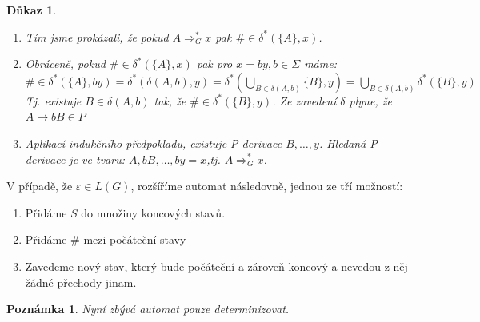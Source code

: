 \documentclass[10pt, a4paper, titlepage]{article}
\theoremstyle{note}
\newtheorem{dukaz}{Důkaz}
\newtheorem{poznamka}{Poznámka}
\begin{document}
\begin{dukaz}
\begin{enumerate}
\item
Tím jsme prokázali, že pokud $A \Rightarrow^*_G x$ pak $\# \in \delta^* ( \lbrace A \rbrace , x )$.

\item
Obráceně, pokud $\#\in \delta^* ( \lbrace A \rbrace , x )$ pak pro $x=by, b\in \Sigma$ máme: $ \#\in \delta^* ( \lbrace A \rbrace , by ) = \delta^* ( \delta (A,b), y ) = \delta^* (\bigcup_{B\in\delta(A,b)}{\lbrace B \rbrace}, y) = \bigcup_{B\in\delta(A,b)}{\delta^* ( \lbrace B \rbrace , y)}$
Tj. existuje $ B \in \delta (A,b) $ tak, že $ \#\in\delta^* ( \lbrace B \rbrace ,y)$. Ze zavedení $\delta$ plyne, že $A \rightarrow bB \in P$

\item
Aplikací indukčního předpokladu, existuje P-derivace $B,\ldots,y$. Hledaná P-derivace je ve tvaru: $A,bB,\ldots,by=x$,tj. $A \Rightarrow^*_Gx$.
\end{enumerate}
\end{dukaz}

V případě, že $\varepsilon \in L(G)$, rozšíříme automat následovně, jednou ze tří možností:
\begin{enumerate}
\item
Přidáme $S$ do množiny koncových stavů.

\item
Přidáme $\#$ mezi počáteční stavy

\item
Zavedeme nový stav, který bude počáteční a zároveň koncový a nevedou z něj žádné přechody jinam.
\end{enumerate}

\begin{poznamka}
Nyní zbývá automat pouze determinizovat.
\end{poznamka}
\end{document}
